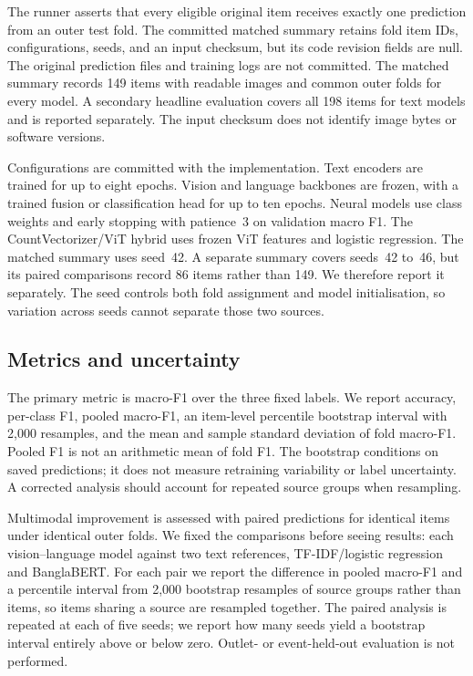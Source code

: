 \documentclass[11pt]{article}
\begin{document}
The runner asserts that every eligible original item receives exactly one prediction from an outer test fold. The committed matched summary retains fold item IDs, configurations, seeds, and an input checksum, but its code revision fields are null. The original prediction files and training logs are not committed. The matched summary records 149 items with readable images and common outer folds for every model. A secondary headline evaluation covers all 198 items for text models and is reported separately. The input checksum does not identify image bytes or software versions. %

Configurations are committed with the implementation. Text encoders are trained for up to eight epochs. Vision and language backbones are frozen, with a trained fusion or classification head for up to ten epochs. Neural models use class weights and early stopping with patience~3 on validation macro F1. The CountVectorizer/ViT hybrid uses frozen ViT features \citep{dosovitskiy2021vit} and logistic regression. The matched summary uses seed~42. A separate summary covers seeds~42 to~46, but its paired comparisons record 86 items rather than 149. We therefore report it separately. The seed controls both fold assignment and model initialisation, so variation across seeds cannot separate those two sources. %

\subsection{Metrics and uncertainty}
The primary metric is macro-F1 over the three fixed labels. We report accuracy, per-class F1, pooled macro-F1, an item-level percentile bootstrap interval with 2,000 resamples, and the mean and sample standard deviation of fold macro-F1. Pooled F1 is not an arithmetic mean of fold F1. The bootstrap conditions on saved predictions; it does not measure retraining variability or label uncertainty. A corrected analysis should account for repeated source groups when resampling.

Multimodal improvement is assessed with paired predictions for identical items under identical outer folds. We fixed the comparisons before seeing results: each vision--language model against two text references, TF-IDF/logistic regression and BanglaBERT. For each pair we report the difference in pooled macro-F1 and a percentile interval from 2,000 bootstrap resamples of source groups rather than items, so items sharing a source are resampled together. The paired analysis is repeated at each of five seeds; we report how many seeds yield a bootstrap interval entirely above or below zero. Outlet- or event-held-out evaluation is not performed.
\end{document}
